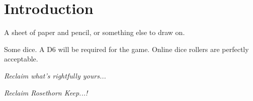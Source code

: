 \documentclass[english,10pt,openany,letterpaper]{book}
\begin{document}




\newpage

\toc[2]

\chapter{Introduction}


\tld  A sheet of paper and pencil, or something else to draw on.

\tld  Some dice. A D6 will be required for the game. Online dice rollers are perfectly acceptable.

\skipline
\begin{adjustbox}{left}
\em Reclaim what’s rightfully yours...\em
\end{adjustbox}
\begin{adjustbox}{right}
	\em Reclaim Rosethorn Keep...! \em
\end{adjustbox}








\end{document}
